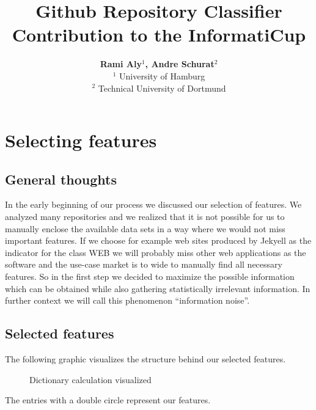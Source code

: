 \documentclass[paper=A4,pagesize=auto,12pt,headinclude=true,footinclude=true,BCOR=0mm,DIV=calc]{scrartcl}
\begin{document}
	
	\title{Github Repository Classifier\\
		Contribution to the InformatiCup}
	\author{\textbf{Rami Aly$^{1}$, Andre Schurat}$^{2}$\\
		$^{1}$ University of Hamburg\\
		$^{2}$ Technical University of Dortmund}
	\maketitle
	
	\newpage
	
	\newpage
	
	\tableofcontents 
	
	\newpage
	\section{Selecting features} 
	\subsection{General thoughts}
	In the early beginning of our process we discussed our selection of features. We analyzed many repositories and we realized that it is not possible for us to manually enclose the available data sets in a way where we would not miss important features. If we choose for example web sites produced by Jekyell as the indicator for the class WEB we will probably miss other web applications as the software and the use-case market is to wide to manually find all necessary features. So in the first step we decided to maximize the possible information which can be obtained while also gathering statistically irrelevant information. In further context we will call this phenomenon “information noise”.
	\subsection{Selected features}
	The following graphic visualizes the structure behind our selected features.
	
	\begin{figure}[H]
		\caption{Dictionary calculation visualized}
	\end{figure}
	The entries with a double circle represent our features.
	
\end{document}
